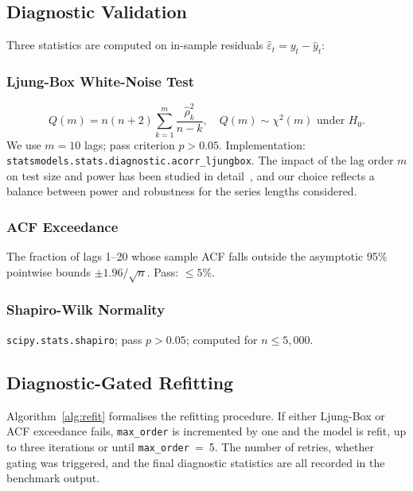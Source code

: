 \documentclass[sn-mathphys-num,pdflatex]{sn-jnl}
\begin{document}
\subsection{Diagnostic Validation}
\label{sec:diag}

Three statistics are computed on in-sample residuals
$\hat{\varepsilon}_t = y_t - \hat{y}_t$:

\subsubsection{Ljung-Box White-Noise Test}
\begin{equation}
Q(m)=n(n{+}2)\sum_{k=1}^{m}\frac{\hat{\rho}_k^2}{n{-}k},
\quad Q(m)\sim\chi^2(m)\text{ under }H_0.
\label{eq:lb}
\end{equation}
We use $m{=}10$ lags; pass criterion $p{>}0.05$.
Implementation: \texttt{statsmodels.stats.diagnostic.acorr\_ljungbox}.
The impact of the lag order $m$ on test size and power has been
studied in detail~\cite{hassani2020lb}, and our choice reflects
a balance between power and robustness for the series lengths considered.

\subsubsection{ACF Exceedance}
The fraction of lags 1--20 whose sample ACF falls outside the
asymptotic 95\% pointwise bounds $\pm1.96/\sqrt{n}$. Pass: $\leq 5\%$.

\subsubsection{Shapiro-Wilk Normality}
\texttt{scipy.stats.shapiro}; pass $p{>}0.05$; computed for $n\leq5{,}000$.

\subsection{Diagnostic-Gated Refitting}
\label{sec:refitting}

Algorithm~\ref{alg:refit} formalises the refitting procedure.
If either Ljung-Box or ACF exceedance fails, \texttt{max\_order}
is incremented by one and the model is refit, up to three iterations
or until \texttt{max\_order}~=~5. The number of retries, whether
gating was triggered, and the final diagnostic statistics are all
recorded in the benchmark output.
\end{document}
